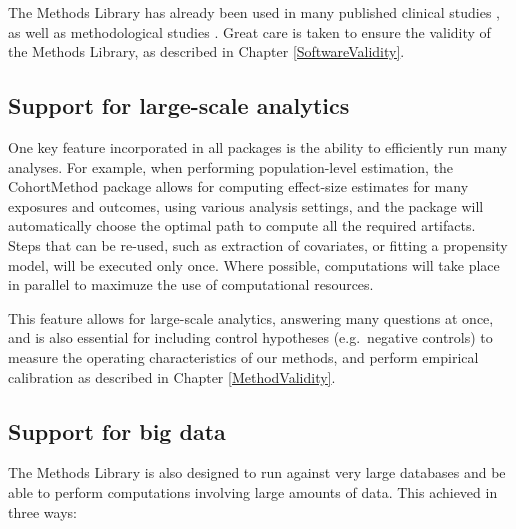 \documentclass[11pt]{book}
\begin{document}
The Methods Library has already been used in many published clinical
studies
\citep{boland_2017, duke_2017, ramcharran_2017, weinstein_2017, wang_2017, ryan_2018, vashisht_2018, yuan_2018, johnston_2019},
as well as methodological studies
\citep{schuemie_2014, schuemie_2016, reps2018, tian_2018, schuemie_2018, schuemie_2018b, reps_2019}.
Great care is taken to ensure the validity of the Methods Library, as
described in Chapter \ref{SoftwareValidity}.

\subsection{Support for large-scale
analytics}\label{support-for-large-scale-analytics}

One key feature incorporated in all packages is the ability to
efficiently run many analyses. For example, when performing
population-level estimation, the CohortMethod package allows for
computing effect-size estimates for many exposures and outcomes, using
various analysis settings, and the package will automatically choose the
optimal path to compute all the required artifacts. Steps that can be
re-used, such as extraction of covariates, or fitting a propensity
model, will be executed only once. Where possible, computations will
take place in parallel to maximuze the use of computational resources.

This feature allows for large-scale analytics, answering many questions
at once, and is also essential for including control hypotheses
(e.g.~negative controls) to measure the operating characteristics of our
methods, and perform empirical calibration as described in Chapter
\ref{MethodValidity}.

\subsection{Support for big data}\label{BigDataSupport}

The Methods Library is also designed to run against very large databases
and be able to perform computations involving large amounts of data.
This achieved in three ways:
\end{document}
